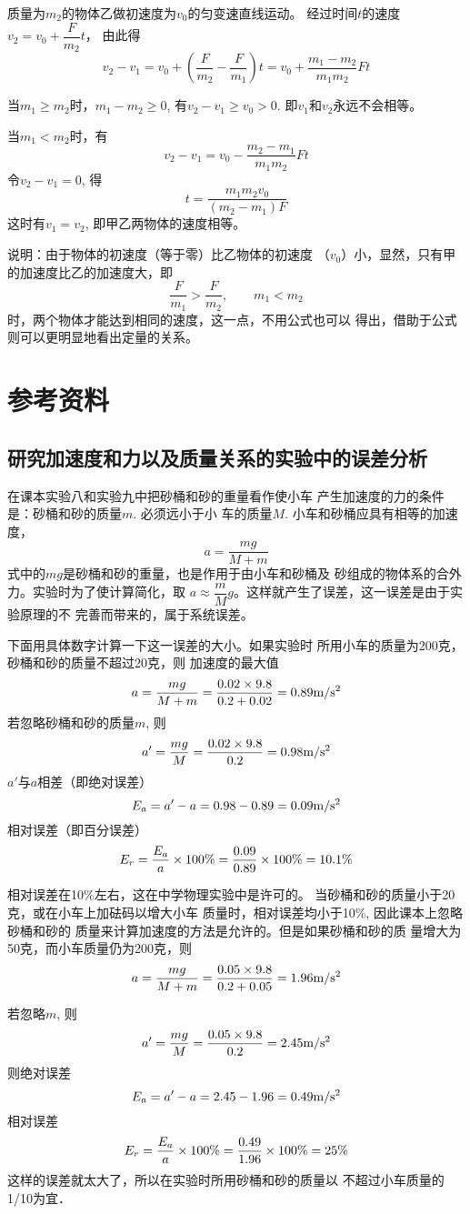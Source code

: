 \begin{enumerate}
\begin{solution}
质量为$m_2$的物体乙做初速度为$v_0$的匀变速直线运动。
经过时间$t$的速度$v_2=v_0+\dfrac{F}{m_2}t$，
由此得
\[v_2-v_1=v_0+\left(\dfrac{F}{m_2}-\dfrac{F}{m_1}\right)t=v_0+\frac{m_1-m_2}{m_1m_2}Ft\]

当$m_1\ge m_2$时，$m_1-m_2\ge 0$, 有$v_2-v_1\ge v_0>0$. 即$v_1$和$v_2$永远不会相等。

当$m_1<m_2$时，有
\[v_2-v_1=v_0-\frac{m_2-m_1}{m_1m_2}Ft\]
令$v_2-v_1=0$, 得
\[t=\frac{m_1m_2v_0}{(m_2-m_1)F}\]
这时有$v_1=v_2$, 即甲乙两物体的速度相等。

说明：由于物体的初速度（等于零）比乙物体的初速度
（$v_0$）小，显然，只有甲的加速度比乙的加速度大，即
\[\frac{F}{m_1}>\frac{F}{m_2},\qquad m_1<m_2\]
时，两个物体才能达到相同的速度，这一点，不用公式也可以
得出，借助于公式则可以更明显地看出定量的关系。
\end{solution}
\end{enumerate}

\section{参考资料}
\subsection{研究加速度和力以及质量关系的实验中的误差分析}

在课本实验八和实验九中把砂桶和砂的重量看作使小车
产生加速度的力的条件是：砂桶和砂的质量$m$. 必须远小于小
车的质量$M$. 小车和砂桶应具有相等的加速度，
\[a=\frac{mg}{M+m}\]
式中的$mg$是砂桶和砂的重量，也是作用于由小车和砂桶及
砂组成的物体系的合外力。实验时为了使计算简化，取
$a\approx \dfrac{m}{M}g$。这样就产生了误差，这一误差是由于实验原理的不
完善而带来的，属于系统误差。

下面用具体数字计算一下这一误差的大小。如果实验时
所用小车的质量为200克，砂桶和砂的质量不超过20克，则
加速度的最大值
\[a=\frac{mg}{M+m}=\frac{0.02\times 9.8}{0.2+0.02}=0.89\text{m}/\text{s}^2\]
若忽略砂桶和砂的质量$m$, 则
\[a'=\frac{mg}{M}=\frac{0.02\times 9.8}{0.2}=0.98\text{m}/\text{s}^2\]
$a'$与$a$相差（即绝对误差）
\[E_a=a'-a=0.98-0.89=0.09\text{m}/\text{s}^2\]
相对误差（即百分误差）
\[E_r=\frac{E_a}{a}\times 100\%=\frac{0.09}{0.89}\times 100\%=10.1\%\]

相对误差在10\%左右，这在中学物理实验中是许可的。
当砂桶和砂的质量小于20克，或在小车上加砝码以增大小车
质量时，相对误差均小于10\%, 因此课本上忽略砂桶和砂的
质量来计算加速度的方法是允许的。但是如果砂桶和砂的质
量增大为50克，而小车质量仍为200克，则
\[a=\frac{mg}{M+m}=\frac{0.05\times 9.8}{0.2+0.05}=1.96\text{m}/\text{s}^2\]

若忽略$m$, 则
\[a'=\frac{mg}{M}=\frac{0.05\times 9.8}{0.2}=2.45\text{m}/\text{s}^2\]
则绝对误差
\[E_a=a'-a=2.45-1.96=0.49\text{m}/\text{s}^2\]
相对误差
\[E_r=\frac{E_a}{a}\times 100\%=\frac{0.49}{1.96}\times 100\%=25\%\]
这样的误差就太大了，所以在实验时所用砂桶和砂的质量以
不超过小车质量的1/10为宜．

